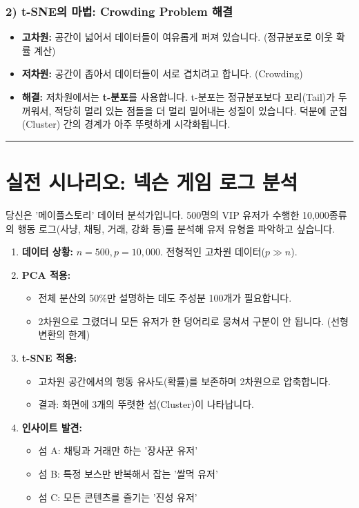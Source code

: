 \documentclass[11pt,a4paper]{book}
\theoremstyle{definition}
\begin{document}
\subsubsection*{2) t-SNE의 마법: Crowding Problem 해결}

\begin{itemize}
    \item \textbf{고차원:} 공간이 넓어서 데이터들이 여유롭게 퍼져 있습니다. (정규분포로 이웃 확률 계산)
    \item \textbf{저차원:} 공간이 좁아서 데이터들이 서로 겹치려고 합니다. (Crowding)
    \item \textbf{해결:} 저차원에서는 \textbf{t-분포}를 사용합니다. t-분포는 정규분포보다 꼬리(Tail)가 두꺼워서, 적당히 멀리 있는 점들을 더 멀리 밀어내는 성질이 있습니다. 덕분에 군집(Cluster) 간의 경계가 아주 뚜렷하게 시각화됩니다.
\end{itemize}

\vspace{0.5cm}\hrule\vspace{0.5cm}

\section{실전 시나리오: 넥슨 게임 로그 분석}

\begin{storybox}[title={Scenario: 유저 행동 패턴 시각화}]
당신은 '메이플스토리' 데이터 분석가입니다. 500명의 VIP 유저가 수행한 10,000종류의 행동 로그(사냥, 채팅, 거래, 강화 등)를 분석해 유저 유형을 파악하고 싶습니다.
\end{storybox}

\begin{enumerate}
    \item \textbf{데이터 상황:} $n=500, p=10,000$. 전형적인 고차원 데이터($p \gg n$).
    \item \textbf{PCA 적용:}
    \begin{itemize}
        \item 전체 분산의 50\%만 설명하는 데도 주성분 100개가 필요합니다.
        \item 2차원으로 그렸더니 모든 유저가 한 덩어리로 뭉쳐서 구분이 안 됩니다. (선형 변환의 한계)
    \end{itemize}
    \item \textbf{t-SNE 적용:}
    \begin{itemize}
        \item 고차원 공간에서의 행동 유사도(확률)를 보존하며 2차원으로 압축합니다.
        \item 결과: 화면에 3개의 뚜렷한 섬(Cluster)이 나타납니다.
    \end{itemize}
    \item \textbf{인사이트 발견:}
    \begin{itemize}
        \item 섬 A: 채팅과 거래만 하는 '장사꾼 유저'
        \item 섬 B: 특정 보스만 반복해서 잡는 '쌀먹 유저'
        \item 섬 C: 모든 콘텐츠를 즐기는 '진성 유저'
    \end{itemize}
\end{enumerate}
\end{document}
